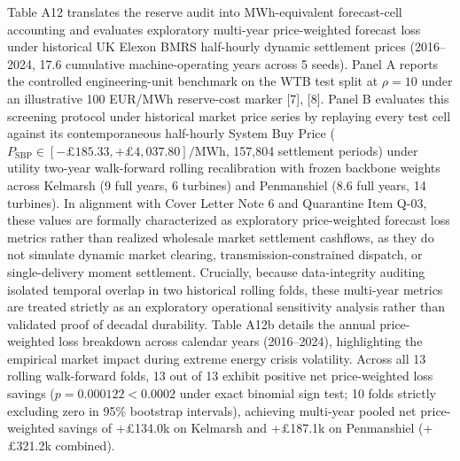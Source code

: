 \documentclass[
  journal]{IEEEtran}
\begin{document}
Table A12 translates the reserve audit into MWh-equivalent forecast-cell
accounting and evaluates exploratory multi-year price-weighted forecast
loss under historical UK Elexon BMRS half-hourly dynamic settlement
prices (2016--2024, 17.6 cumulative machine-operating years across 5
seeds). Panel A reports the controlled engineering-unit benchmark on the
WTB test split at \(\rho=10\) under an illustrative 100 EUR/MWh
reserve-cost marker {[}7{]}, {[}8{]}. Panel B evaluates this screening
protocol under historical market price series by replaying every test
cell against its contemporaneous half-hourly System Buy Price
(\(P_{\mathrm{SBP}} \in [-£185.33, +£4,037.80]/\text{MWh}\), 157,804
settlement periods) under utility two-year walk-forward rolling
recalibration with frozen backbone weights across Kelmarsh (9 full
years, 6 turbines) and Penmanshiel (8.6 full years, 14 turbines). In
alignment with Cover Letter Note 6 and Quarantine Item Q-03, these
values are formally characterized as exploratory price-weighted forecast
loss metrics rather than realized wholesale market settlement cashflows,
as they do not simulate dynamic market clearing,
transmission-constrained dispatch, or single-delivery moment settlement.
Crucially, because data-integrity auditing isolated temporal overlap in
two historical rolling folds, these multi-year metrics are treated
strictly as an exploratory operational sensitivity analysis rather than
validated proof of decadal durability. Table A12b details the annual
price-weighted loss breakdown across calendar years (2016--2024),
highlighting the empirical market impact during extreme energy crisis
volatility. Across all 13 rolling walk-forward folds, 13 out of 13
exhibit positive net price-weighted loss savings
(\(p = 0.000122 < 0.0002\) under exact binomial sign test; 10 folds
strictly excluding zero in 95\% bootstrap intervals), achieving
multi-year pooled net price-weighted savings of +£134.0k on Kelmarsh and
+£187.1k on Penmanshiel (+£321.2k combined).
\end{document}
